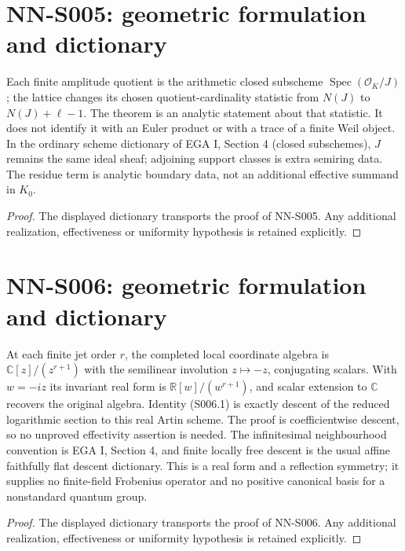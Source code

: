 \section{NN-S005: geometric formulation and dictionary}
\begin{geometricstatement}[NN-S005]
Each finite amplitude quotient is the arithmetic closed
subscheme $\operatorname{Spec}(\mathcal O_K/J)$; the lattice
changes its chosen quotient-cardinality statistic from $N(J)$ to
$N(J)+\ell-1$. The theorem is an analytic statement about that
statistic. It does not identify it with an Euler product or with
a trace of a finite Weil object. In the ordinary scheme dictionary
of EGA I, Section 4 (closed subschemes), $J$ remains the same
ideal sheaf; adjoining support classes is extra semiring data.
The residue term is analytic boundary data, not an additional
effective summand in $K_0$.
\end{geometricstatement}
\begin{proof} The displayed dictionary transports the proof of NN-S005. Any additional realization, effectiveness or uniformity hypothesis is retained explicitly.\end{proof}


\section{NN-S006: geometric formulation and dictionary}
\begin{geometricstatement}[NN-S006]
At each finite jet order $r$, the completed local coordinate
algebra is $\mathbb C[z]/(z^{r+1})$ with the semilinear involution
$z\mapsto-z$, conjugating scalars. With $w=-iz$ its invariant
real form is $\mathbb R[w]/(w^{r+1})$, and scalar extension to
$\mathbb C$ recovers the original algebra. Identity (S006.1)
is exactly descent of the reduced logarithmic section to this
real Artin scheme. The proof is coefficientwise descent, so no
unproved effectivity assertion is needed. The infinitesimal
neighbourhood convention is EGA I, Section 4, and finite locally
free descent is the usual affine faithfully flat descent
dictionary. This is a real form and a reflection symmetry;
it supplies no finite-field Frobenius operator and no positive
canonical basis for a nonstandard quantum group.
\end{geometricstatement}
\begin{proof} The displayed dictionary transports the proof of NN-S006. Any additional realization, effectiveness or uniformity hypothesis is retained explicitly.\end{proof}


